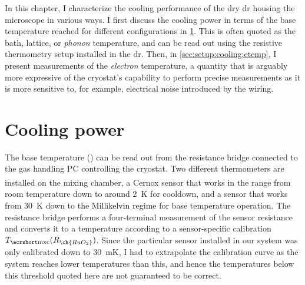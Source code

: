 In this chapter, I characterize the cooling performance of the dry \gls{dr} housing the microscope in various ways.
I first discuss the cooling power in terms of the base temperature \Tmxc reached for different configurations in \cref{sec:setup:cooling:power}.
This is often quoted as the bath, lattice, or \emph{phonon} temperature,
and can be read out using the resistive  thermometry setup installed in the \gls{dr}.
Then, in \cref{sec:setup:cooling:etemp}, I present measurements of the \emph{electron} temperature, a quantity that is arguably more expressive of the cryostat's capability to perform precise measurements as it is more sensitive to, for example, electrical noise introduced by the wiring.

\section{Cooling power}\label{sec:setup:cooling:power}
The base temperature (\Tmxc) can be read out from the resistance bridge connected to the gas handling PC controlling the cryostat.
Two different thermometers are installed on the mixing chamber, a Cernox\textsuperscript{\textregistered} sensor that works in the range from room temperature down to around \qty{2}{\kelvin} for cooldown, and a  sensor that works from \qty{30}{\kelvin} down to the Millikelvin regime for base temperature operation.
The resistance bridge performs a four-terminal measurement of the sensor resistance and converts it to a temperature according to a sensor-specific calibration $\Tmxc(R_{\ch{RuO_2}})$.
Since the particular sensor installed in our system was only calibrated down to \qty{30}{\milli\kelvin}, I had to extrapolate the calibration curve as the system reaches lower temperatures than this, and hence the temperatures below this threshold quoted here are not guaranteed to be correct.

